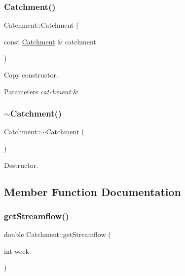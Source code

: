 \subsubsection{\texorpdfstring{Catchment()}{Catchment()}\hspace{0.1cm}{\footnotesize\ttfamily [2/2]}}
{\footnotesize\ttfamily Catchment\+::\+Catchment (\begin{DoxyParamCaption}\item[{const \mbox{\hyperlink{classCatchment}{Catchment}} \&}]{catchment }\end{DoxyParamCaption})}

Copy constructor. 
\begin{DoxyParams}{Parameters}
{\em catchment} & \\
\hline
\end{DoxyParams}
\mbox{\label{classCatchment_a7c8073fc1dd2e2fa9fa8bfc68ce120bd_a7c8073fc1dd2e2fa9fa8bfc68ce120bd}} 
\subsubsection{\texorpdfstring{$\sim$\+Catchment()}{~Catchment()}}
{\footnotesize\ttfamily Catchment\+::$\sim$\+Catchment (\begin{DoxyParamCaption}{ }\end{DoxyParamCaption})\hspace{0.3cm}{\ttfamily [virtual]}}

Destructor. 

\subsection{Member Function Documentation}
\mbox{\label{classCatchment_af4e8206ffab5c901e5e4cdd6136f73a1_af4e8206ffab5c901e5e4cdd6136f73a1}} 
\subsubsection{\texorpdfstring{get\+Streamflow()}{getStreamflow()}}
{\footnotesize\ttfamily double Catchment\+::get\+Streamflow (\begin{DoxyParamCaption}\item[{int}]{week }\end{DoxyParamCaption})}

